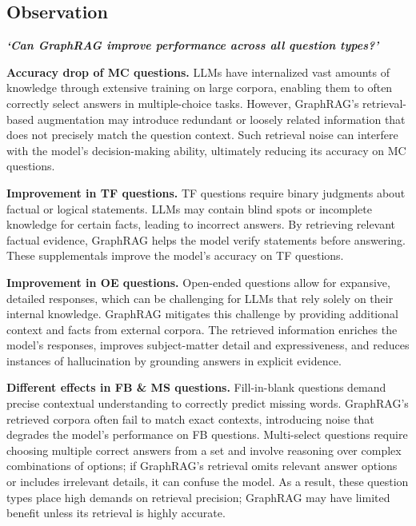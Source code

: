 \documentclass{article}
\begin{document}
\subsection{Observation}
\textit{\textbf{`Can GraphRAG improve performance across all question types?'}}

\textbf{Accuracy drop of MC questions.} LLMs have internalized vast amounts of knowledge through extensive training on large corpora, enabling them to often correctly select answers in multiple-choice tasks. However, GraphRAG’s retrieval-based augmentation may introduce redundant or loosely related information that does not precisely match the question context. Such retrieval noise can interfere with the model’s decision-making ability, ultimately reducing its accuracy on MC questions.

\textbf{Improvement in TF questions.} TF questions require binary judgments about factual or logical statements. LLMs may contain blind spots or incomplete knowledge for certain facts, leading to incorrect answers. By retrieving relevant factual evidence, GraphRAG helps the model verify statements before answering. These supplementals improve the model’s accuracy on TF questions.

\textbf{Improvement in OE questions.} Open-ended questions allow for expansive, detailed responses, which can be challenging for LLMs that rely solely on their internal knowledge. GraphRAG mitigates this challenge by providing additional context and facts from external corpora. The retrieved information enriches the model’s responses, improves subject-matter detail and expressiveness, and reduces instances of hallucination by grounding answers in explicit evidence.

\textbf{Different effects in FB \& MS questions.} Fill-in-blank questions demand precise contextual understanding to correctly predict missing words. GraphRAG’s retrieved corpora often fail to match exact contexts, introducing noise that degrades the model’s performance on FB questions. Multi-select questions require choosing multiple correct answers from a set and involve reasoning over complex combinations of options; if GraphRAG’s retrieval omits relevant answer options or includes irrelevant details, it can confuse the model. As a result, these question types place high demands on retrieval precision; GraphRAG may have limited benefit unless its retrieval is highly accurate.
\end{document}
